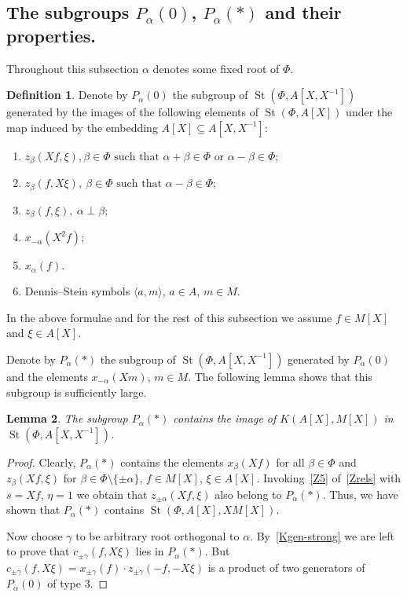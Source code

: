 \documentclass[oneside, 8pt]{amsart}
\newtheorem{lemma}{Lemma}
\theoremstyle{remark}
\theoremstyle{definition}
\newtheorem{df}[lemma]{Definition} \Crefname{df}{Definition}{Definitions}
\DeclareMathOperator{\St}{St}
\numberwithin{equation}{section}
\begin{document}
\subsection{The subgroups $P_\alpha(0)$, $P_\alpha(*)$ and their properties.} Throughout this subsection $\alpha$ denotes some fixed root of $\Phi$.
\begin{df} \label{defP0}
Denote by $P_\alpha(0)$ the subgroup of $\St(\Phi, A[X, X^{-1}])$ generated by the images of the following elements of $\St(\Phi, A[X])$ under the
 map induced by the embedding $A[X] \subseteq A[X, X^{-1}]$:
\begin{enumerate}
 \item $z_{\beta}(Xf, \xi), \beta \in \Phi \text{ such that }\alpha + \beta \in \Phi\text{ or } \alpha - \beta \in \Phi;$
 \item $z_{\beta}(f, X\xi),\ \beta \in \Phi \text{ such that }\alpha - \beta \in \Phi;$
 \item $z_{\beta}(f, \xi),\ \alpha \perp \beta;$
 \item $x_{-\alpha}(X^2f);$
 \item $x_{\alpha}(f).$ 
 \item Dennis--Stein symbols $\langle a, m \rangle$, $a\in A$, $m\in M$.
\end{enumerate}
In the above formulae and for the rest of this subsection we assume $f \in M[X]$ and $\xi \in A[X]$.
\end{df}

Denote by $P_\alpha(*)$ the subgroup of $\St(\Phi, A[X, X^{-1}])$ generated by $P_\alpha(0)$ and the elements $x_{-\alpha}(Xm)$, $m \in M$. The following lemma shows that this subgroup is sufficiently large.
\begin{lemma} \label{Pstar-large} The subgroup $P_\alpha(*)$ contains the image of $K(A[X], M[X])$ in $\St(\Phi, A[X, X^{-1}])$. \end{lemma}
\begin{proof} Clearly, $P_\alpha(*)$ contains the elements $x_\beta(Xf)$ for all $\beta \in \Phi$ and $z_\beta(Xf, \xi)$ for $\beta \in \Phi \setminus \{\pm \alpha\}$, $f \in M[X]$, $\xi\in A[X]$. 
Invoking~\eqref{Z5} of~\cref{Zrels} with $s = Xf$, $\eta = 1$ we obtain that $z_{\pm\alpha}(Xf, \xi)$ also belong to $P_{\alpha}(*)$. Thus, we have shown that $P_\alpha(*)$ contains $\St(\Phi, A[X], XM[X])$.

Now choose $\gamma$ to be arbitrary root orthogonal to $\alpha$. By~\cref{Kgen-strong} we are left to prove that $c_{\pm \gamma}(f, X\xi)$ lies in $P_\alpha(*)$. 
But $c_{\pm \gamma}(f, X\xi) = x_{\pm \gamma}(f) \cdot z_{\pm \gamma}(-f, -X\xi)$ is a product of two generators of $P_\alpha(0)$ of type 3. \end{proof}
\end{document}
